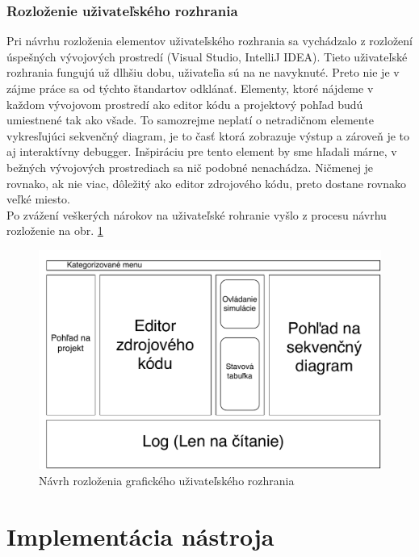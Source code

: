 \subsection{Rozloženie uživateľského rozhrania}

Pri návrhu rozloženia elementov uživateľského rozhrania sa vychádzalo z rozložení úspešných vývojových prostredí (Visual Studio, IntelliJ IDEA). Tieto uživateľské rozhrania fungujú už dlhšiu dobu, uživateľia sú na ne navyknuté. Preto nie je v zájme práce sa od týchto štandartov odklánať. Elementy, ktoré nájdeme v každom vývojovom prostredí ako editor kódu a projektový pohľad budú umiestnené tak ako všade.
To samozrejme neplatí o netradičnom elemente vykresľujúci sekvenčný diagram, je to časť ktorá zobrazuje výstup a zároveň je to aj interaktívny debugger. Inšpiráciu pre tento element by sme hľadali márne, v bežných vývojových prostrediach sa nič podobné nenachádza.
Ničmenej je rovnako, ak nie viac, dôležitý ako editor zdrojového kódu, preto dostane rovnako veľké miesto. \\

Po zvážení veškerých nárokov na uživateľské rohranie vyšlo z procesu návrhu rozloženie na obr. \ref{fig:ui-layout}

\begin{figure}[H]
	\label{fig:ui-layout}
	\centering
	\includegraphics[scale=0.75]{obrazky-figures/UI-layout}
	\caption{Návrh rozloženia grafického uživateľského rozhrania}
\end{figure}



\chapter{Implementácia nástroja}

